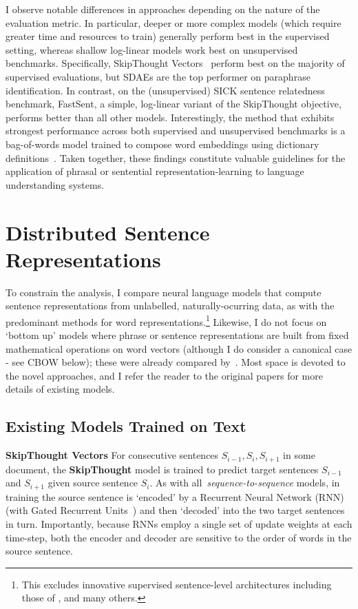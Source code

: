 I observe notable differences in approaches depending on the nature of the evaluation metric. In particular, deeper or more complex models (which require greater time and resources to train) generally perform best in the supervised setting, whereas shallow log-linear models work best on unsupervised benchmarks. Specifically, SkipThought Vectors~\citep{kiros2015skip} perform best on the majority of supervised evaluations, but SDAEs are the top performer on paraphrase identification. In contrast, on the (unsupervised) SICK sentence relatedness benchmark, FastSent, a simple, log-linear variant of the SkipThought objective, performs better than all other models. Interestingly, the method that exhibits strongest performance across both supervised and unsupervised benchmarks is a bag-of-words model trained to compose word embeddings using dictionary definitions~\citep{hill2015learning}. Taken together, these findings constitute valuable guidelines for the application of phrasal or sentential representation-learning to language understanding systems.

\section{Distributed Sentence Representations}

To constrain the analysis, I compare neural language models that compute sentence representations from unlabelled, naturally-ocurring data, as with the predominant methods for word representations.\footnote{This excludes innovative supervised sentence-level architectures including those of \cite{socher2011semi},\cite{kalchbrenner2014convolutional} and many others.} Likewise, I do not focus on `bottom up' models where phrase or sentence representations are built from fixed mathematical operations on word vectors (although I do consider a canonical case - see CBOW below); these were already compared by~\cite{milajevs2014evaluating}. Most space is devoted to the novel approaches, and I refer the reader to the original papers for more details of existing models. 

\subsection{Existing Models Trained on Text}
{\bf SkipThought Vectors} For consecutive sentences \(S_{i-1},S_i,S_{i+1}\) in some document, the {\bf SkipThought} model \citep{kiros2015skip} is trained to predict target sentences \(S_{i-1}\) and \(S_{i+1}\) given source sentence \(S_i\). As with all~\emph{sequence-to-sequence} models, in training the source sentence is `encoded' by a Recurrent Neural Network (RNN) (with Gated Recurrent Units~\citep{cho2014learning}) and then `decoded' into the two target sentences in turn. Importantly, because RNNs employ a single set of update weights at each time-step, both the encoder and decoder are sensitive to the order of words in the source sentence. 

